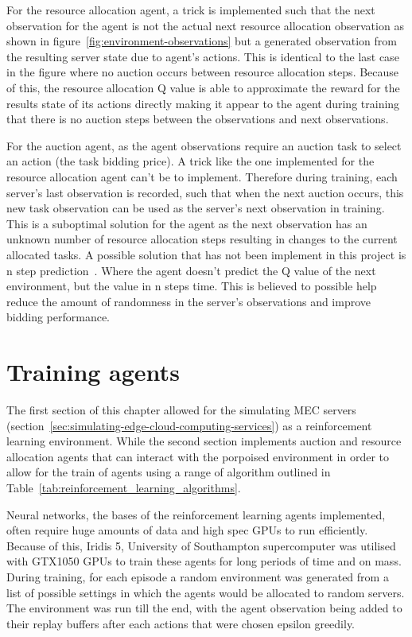 For the resource allocation agent, a trick is implemented such that the next observation for the agent is not the
actual next resource allocation observation as shown in figure~\ref{fig:environment-observations} but a generated
observation from the resulting server state due to agent's actions. This is identical to the last case in the figure
where no auction occurs between resource allocation steps. Because of this, the resource allocation Q value is able to
approximate the reward for the results state of its actions directly making it appear to the agent during training that
there is no auction steps between the observations and next observations.

For the auction agent, as the agent observations require an auction task to select an action (the task bidding price).
A trick like the one implemented for the resource allocation agent can't be to implement. Therefore during training,
each server's last observation is recorded, such that when the next auction occurs, this new task observation can be
used as the server's next observation in training. This is a suboptimal solution for the agent as the next observation
has an unknown number of resource allocation steps resulting in changes to the current allocated tasks.
A possible solution that has not been implement in this project is n step prediction~\citep{multi-step-dqn}. Where the
agent doesn't predict the Q value of the next environment, but the value in n steps time. This is believed to possible
help reduce the amount of randomness in the server's observations and improve bidding performance.

\section{Training agents}\label{sec:training-agents}
The first section of this chapter allowed for the simulating MEC servers
(section~\ref{sec:simulating-edge-cloud-computing-services}) as a reinforcement learning environment. While the second
section implements auction and resource allocation agents that can interact with the porpoised environment in order
to allow for the train of agents using a range of algorithm outlined in Table~\ref{tab:reinforcement_learning_algorithms}.

Neural networks, the bases of the reinforcement learning agents implemented, often require huge amounts of data and
high spec GPUs to run efficiently. Because of this, Iridis 5, University of Southampton supercomputer was utilised with
GTX1050 GPUs to train these agents for long periods of time and on mass. During training, for each episode a random
environment was generated from a list of possible settings in which the agents would be allocated to random servers. The
environment was run till the end, with the agent observation being added to their replay buffers after each actions
that were chosen epsilon greedily.

